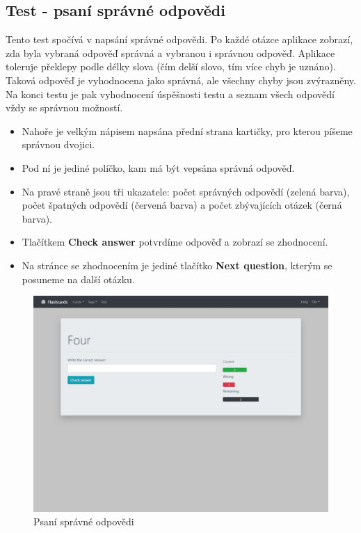 \documentclass[11pt]{article}
\providecommand{\tightlist}{\setlength{\itemsep}{1pt}\setlength{\parskip}{1pt}}
\begin{document}
\hypertarget{test---psanuxed-spruxe1vnuxe9-odpovux11bdi}{%
\subsection{Test - psaní správné
odpovědi}\label{test---psanuxed-spruxe1vnuxe9-odpovux11bdi}}

Tento test spočívá v napsání správné odpovědi. Po každé otázce aplikace
zobrazí, zda byla vybraná odpověď správná a vybranou i správnou odpověď.
Aplikace toleruje překlepy podle délky slova (čím delší slovo, tím více
chyb je uznáno). Taková odpověď je vyhodnocena jako správná, ale všechny
chyby jsou zvýrazněny. Na konci testu je pak vyhodnocení úspěšnosti
testu a seznam všech odpovědí vždy se správnou možností.

\begin{itemize}
\tightlist
\item
  Nahoře je velkým nápisem napsána přední strana kartičky, pro kterou
  píšeme správnou dvojici.
\item
  Pod ní je jediné políčko, kam má být vepsána správná odpověď.
\item
  Na pravé straně jsou tři ukazatele: počet správných odpovědí (zelená
  barva), počet špatných odpovědí (červená barva) a počet zbývajících
  otázek (černá barva).
\item
  Tlačítkem \textbf{Check answer} potvrdíme odpověď a zobrazí se
  zhodnocení.
\item
  Na stránce se zhodnocením je jediné tlačítko \textbf{Next question},
  kterým se posuneme na další otázku.
\end{itemize}

\begin{figure}
\centering
\includegraphics{../../../../assets/write.jpg}
\caption{Psaní správné odpovědi}
\end{figure}
\end{document}
